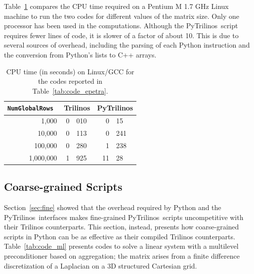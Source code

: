 \documentclass[acmtocl]{acmtrans2m}
\newcommand{\PyTrilinos}{{PyTrilinos}}
\begin{document}
Table~\ref{tab:time_epetra} compares the CPU time required on a
Pentium M 1.7 GHz Linux machine to run the two codes for different
values of the matrix size.  Only one processor has been used in the
computations.  Although the \PyTrilinos\ script requires fewer lines
of code, it is slower of a factor of about 10.  This is due to several
sources of overhead, including the parsing of each Python instruction
and the conversion from Python's lists to C++ arrays.

\begin{table}
  \begin{center}
    \begin{tabular}{|r|r@{.}l|r@{.}l|}
     \hline
      \tt NumGlobalRows & \multicolumn{2}{c|}{Trilinos} &
      \multicolumn{2}{c|}{PyTrilinos} \\
      \hline
          1,000 & 0&010 &  0&15  \\
         10,000 & 0&113 &  0&241 \\
        100,000 & 0&280 &  1&238 \\
      1,000,000 & 1&925 & 11&28  \\
      \hline
    \end{tabular}
    \caption{CPU time (in seconds) on Linux/GCC for the codes reported
      in Table~\ref{tab:code_epetra}.}
    \label{tab:time_epetra}
  \end{center}
\end{table}

\subsection{Coarse-grained Scripts}
\label{sec:coarse}

Section~\ref{sec:fine} showed that the overhead required by Python and
the \PyTrilinos\ interfaces makes fine-grained \PyTrilinos\ scripts
uncompetitive with their Trilinos counterparts.  This section,
instead, presents how coarse-grained scripts in Python can be as
effective as their compiled Trilinos counterparts.
Table~\ref{tab:code_ml} presents codes to solve a linear system with a
multilevel preconditioner based on aggregation; the matrix arises from
a finite difference discretization of a Laplacian on a 3D structured
Cartesian grid.
\end{document}
